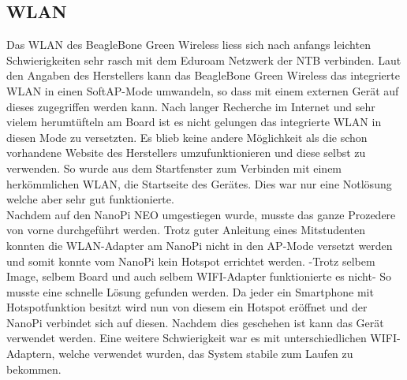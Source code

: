 \subsection{WLAN}
Das WLAN des BeagleBone Green Wireless liess sich nach anfangs leichten Schwierigkeiten sehr rasch mit dem Eduroam Netzwerk der NTB verbinden. Laut den Angaben des Herstellers kann das BeagleBone Green Wireless das integrierte WLAN in einen SoftAP-Mode umwandeln, so dass mit einem externen Gerät auf dieses zugegriffen werden kann. Nach langer Recherche im Internet und sehr vielem herumtüfteln am Board ist es nicht gelungen das integrierte WLAN in diesen Mode zu versetzten. Es blieb keine andere Möglichkeit als die schon vorhandene Website des Herstellers umzufunktionieren und diese selbst zu verwenden. So wurde aus dem Startfenster zum Verbinden mit einem herkömmlichen WLAN, die Startseite des Gerätes. Dies war nur eine Notlösung welche aber sehr gut funktionierte.\\
Nachdem auf den NanoPi NEO umgestiegen wurde, musste das ganze Prozedere von vorne durchgeführt werden. 
Trotz guter Anleitung eines Mitstudenten konnten die WLAN-Adapter am NanoPi nicht in den AP-Mode versetzt werden und somit konnte vom NanoPi kein Hotspot errichtet werden. -Trotz selbem Image, selbem Board und auch selbem WIFI-Adapter funktionierte es nicht-
So musste eine schnelle Lösung gefunden werden. Da jeder ein Smartphone mit Hotspotfunktion besitzt wird nun von diesem ein Hotspot eröffnet und der NanoPi verbindet sich auf diesen. Nachdem dies geschehen ist kann das Gerät verwendet werden. Eine weitere Schwierigkeit war es mit unterschiedlichen WIFI-Adaptern, welche verwendet wurden, das System stabile zum Laufen zu bekommen.

